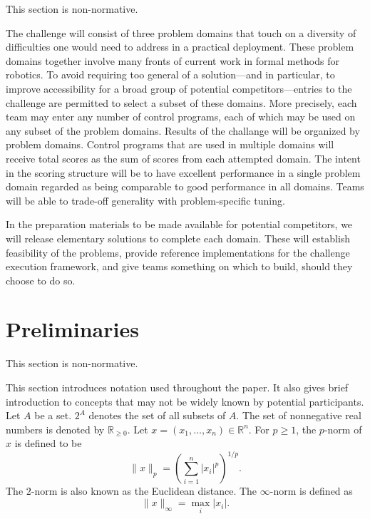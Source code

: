 \documentclass{amsart}
\theoremstyle{definition}
\begin{document}
This section is non-normative.\newline

The challenge will consist of three problem domains that touch on a diversity of
difficulties one would need to address in a practical deployment.  These problem
domains together involve many fronts of current work in formal methods for
robotics.  To avoid requiring too general of a solution---and in particular, to
improve accessibility for a broad group of potential competitors---entries to
the challenge are permitted to select a subset of these domains.  More
precisely, each team may enter any number of control programs, each of which may
be used on any subset of the problem domains.  Results of the challange will be
organized by problem domains.  Control programs that are used in multiple
domains will receive total scores as the sum of scores from each attempted
domain.  The intent in the scoring structure will be to have excellent
performance in a single problem domain regarded as being comparable to good
performance in all domains.  Teams will be able to trade-off generality with
problem-specific tuning.

In the preparation materials to be made available for potential competitors, we
will release elementary solutions to complete each domain.  These will establish
feasibility of the problems, provide reference implementations for the challenge
execution framework, and give teams something on which to build, should they
choose to do so.


\section{Preliminaries}

This section is non-normative.\newline

This section introduces notation used throughout the paper.  It also gives brief
introduction to concepts that may not be widely known by potential participants.
Let $A$ be a set.  $2^A$ denotes the set of all subsets of $A$.  The
set of nonnegative real numbers is denoted by $\mathbb{R}_{\geq 0}$.  Let
$x=(x_1 , \ldots, x_n )\in \mathbb{R}^n$.  For $p \geq 1$, the $p$-norm of $x$
is defined to be
\begin{equation}
\lVert x \rVert_{p} = \left( \sum_{i=1}^{n}\lvert x_i \rvert^{p} \right)^{1/p} .
\end{equation}
The $2$-norm is also known as the Euclidean distance.  The $\infty$-norm is
defined as
\begin{equation}
\lVert x \rVert_{\infty} = \max_{i}\lvert x_i \rvert .
\end{equation}
\end{document}
